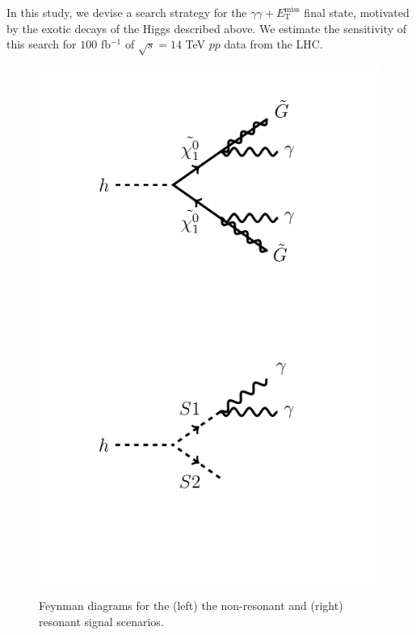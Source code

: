\documentclass[11pt]{article}
\newcommand{\MET}{\ensuremath{E_{\mathrm{T}}^{\mathrm{miss}}}\xspace}
\begin{document}
In this study, we devise a search strategy for the $\gamma\gamma+\MET$ final state, motivated by the exotic decays of the Higgs described above. We estimate the sensitivity of this search for $100$ fb$^{-1}$ of $\sqrt{s}=14$ TeV $pp$ data from the LHC.


\begin{figure}[htbp]
\centering
\includegraphics[scale=0.2]{figs/feyn/feyn_nonres.pdf}
\hspace{1cm}
\includegraphics[scale=0.2]{figs/feyn/feyn_res.pdf}
\caption{Feynman diagrams for the (left) the non-resonant and (right) resonant signal scenarios.}
\label{fig:FEYN_SIG}
\end{figure}
\end{document}
